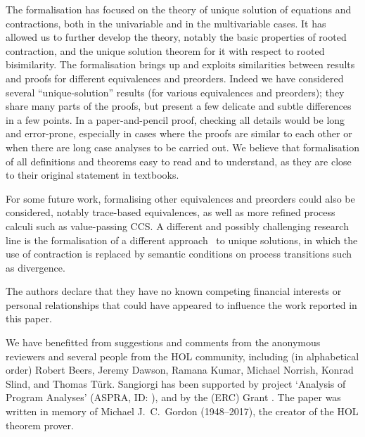 \documentclass[GCNS]{yincog}
\theoremstyle{remark}
\theoremstyle{theorem}
\theoremstyle{remark}
\newcommand{\univariate}{univariable\xspace}
\newcommand{\multivariate}{multivariable\xspace}
\begin{document}
The formalisation has focused on the theory of unique solution of equations
and contractions, both in the \univariate and in the \multivariate cases.
It has allowed us to further develop the theory, notably the basic properties
of rooted contraction, and the unique solution theorem for it with respect
to rooted bisimilarity. The formalisation brings up and exploits similarities
between results and proofs for different equivalences and preorders. Indeed
we have considered several ``unique-solution'' results (for various equivalences
and preorders); they share many parts of the proofs, but present a few
delicate and subtle differences in a few points. In a paper-and-pencil
proof, checking all details would be long and error-prone, especially in
cases where the proofs are similar to each other or when there are long
case analyses to be carried out. We believe that  formalisation of all
definitions and theorems  easy to read and to understand, as they are
close to their original statement in textbooks.

For some future work, formalising other equivalences and preorders could
also be considered, notably trace-based equivalences, as well as more refined
process calculi such as value-passing CCS. A different and possibly challenging
research line is the formalisation of a different approach~\cite{DurierHS17,DurierHS18}
to unique solutions, in which the use of contraction is replaced by semantic
conditions on process transitions such as divergence.



\begin{conflict}
The authors declare that they have no known competing financial interests or personal
relationships that could have appeared to influence the work reported in this paper.
\end{conflict}

\begin{acks}
We have benefitted from suggestions and comments from the anonymous reviewers
and several people from the HOL community, including (in alphabetical order)
Robert Beers, Jeremy Dawson, Ramana Kumar, Michael Norrish, Konrad Slind,
and Thomas T\"{u}rk. Sangiorgi has been supported by  project
`Analysis of Program Analyses' (ASPRA, ID: \texttt{}), and
by the  (ERC) Grant . The paper
was written in memory of Michael J.~C.~Gordon (1948--2017), the creator
of the HOL theorem prover.
\end{acks}
\end{document}
